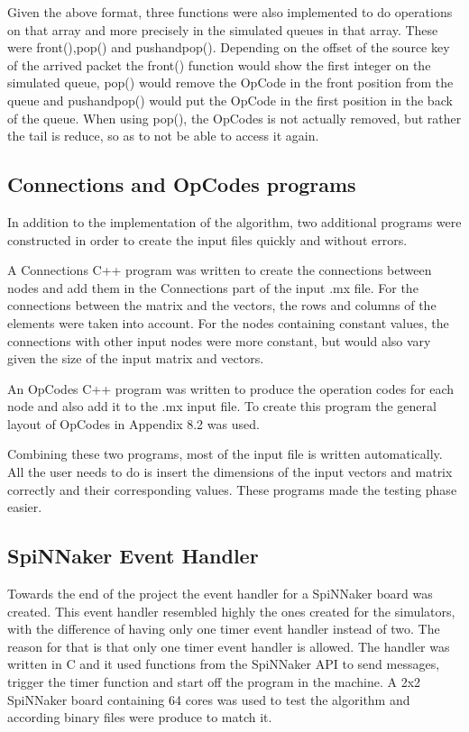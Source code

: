 \documentclass[12pt,a4paper]{article}
\begin{document}
Given the above format, three functions were also implemented to do operations on that array and more precisely in the simulated queues in that array. These were front(),pop() and pushandpop(). Depending on the offset of the source key of the arrived packet the front() function would show the first integer on the simulated queue, pop() would remove the OpCode in the front position from the queue and pushandpop() would put the OpCode in the first position in the back of the queue. When using pop(), the OpCodes is not actually removed, but rather the tail is reduce, so as to not be able to access it again.
\subsection{Connections and OpCodes programs}
In addition to the implementation of the algorithm, two additional programs were constructed in order to create the input files quickly and without errors. 

A Connections C++ program was written to create the connections between nodes and add them in the Connections part of the input .mx file. For the connections between the matrix and the vectors, the rows and columns of the elements were taken into account. For the nodes containing constant values, the connections with other input nodes were more constant, but would also vary given the size of the input matrix and vectors. 

An OpCodes C++ program was written to produce  the operation codes for each node and also add it to the .mx input file. To create this program the general layout of OpCodes in Appendix 8.2 was used.

Combining these two programs, most of the input file is written automatically. All the user needs to do is insert the dimensions of the input vectors and matrix correctly and their corresponding values. These programs made the testing phase easier.
\subsection{SpiNNaker Event Handler}
Towards the end of the project the event handler for a SpiNNaker board was created. This event handler resembled highly the ones created for the simulators, with the difference of having only one timer event handler instead of two. The reason for that is that only one timer event handler is allowed. The handler was written in C and it used functions from the SpiNNaker API to send messages, trigger the timer function and start off the program in the machine. A 2x2 SpiNNaker board containing 64 cores was used to test the algorithm and according binary files were produce to match it.
\end{document}
